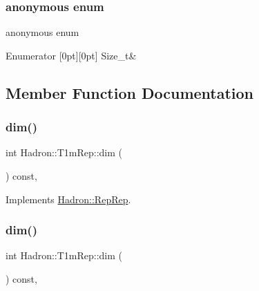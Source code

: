 \subsubsection{\texorpdfstring{anonymous enum}{anonymous enum}}
{\footnotesize\ttfamily anonymous enum}

\begin{DoxyEnumFields}{Enumerator}
[0pt][0pt]{}\mbox{\label{structHadron_1_1T1mRep_a7003d2e3f94daee20ea810135f4e42a2a4f817982fd5f82d5f1e1d9126415dbc2}} 
Size\+\_\+t&\\
\hline

\end{DoxyEnumFields}


\subsection{Member Function Documentation}
\mbox{\label{structHadron_1_1T1mRep_a6752f30731a94469c77ea15a78ddf9d9}} 
\subsubsection{\texorpdfstring{dim()}{dim()}\hspace{0.1cm}{\footnotesize\ttfamily [1/5]}}
{\footnotesize\ttfamily int Hadron\+::\+T1m\+Rep\+::dim (\begin{DoxyParamCaption}{ }\end{DoxyParamCaption}) const\hspace{0.3cm}{\ttfamily [inline]}, {\ttfamily [virtual]}}



Implements \mbox{\hyperlink{structHadron_1_1RepRep_a92c8802e5ed7afd7da43ccfd5b7cd92b}{Hadron\+::\+Rep\+Rep}}.

\mbox{\label{structHadron_1_1T1mRep_a6752f30731a94469c77ea15a78ddf9d9}} 
\subsubsection{\texorpdfstring{dim()}{dim()}\hspace{0.1cm}{\footnotesize\ttfamily [2/5]}}
{\footnotesize\ttfamily int Hadron\+::\+T1m\+Rep\+::dim (\begin{DoxyParamCaption}{ }\end{DoxyParamCaption}) const\hspace{0.3cm}{\ttfamily [inline]}, {\ttfamily [virtual]}}




